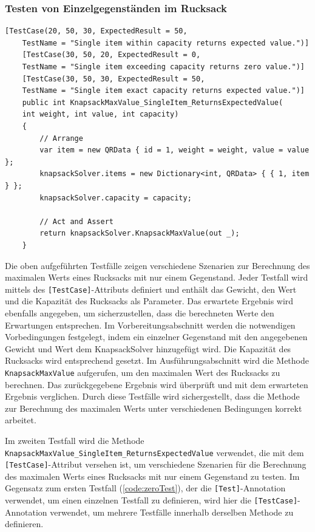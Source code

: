 \begin{itemize}
\subsubsection{Testen von Einzelgegenständen im Rucksack}

\begin{lstlisting}[style=csharp, caption={Testfall: einzelne Gegenstände}, label={code:einzelTest}]
    [TestCase(20, 50, 30, ExpectedResult = 50,
    TestName = "Single item within capacity returns expected value.")]
    [TestCase(30, 50, 20, ExpectedResult = 0,
    TestName = "Single item exceeding capacity returns zero value.")]
    [TestCase(30, 50, 30, ExpectedResult = 50,
    TestName = "Single item exact capacity returns expected value.")]
    public int KnapsackMaxValue_SingleItem_ReturnsExpectedValue(
    int weight, int value, int capacity)
    {
        // Arrange
        var item = new QRData { id = 1, weight = weight, value = value };
        knapsackSolver.items = new Dictionary<int, QRData> { { 1, item } };
        knapsackSolver.capacity = capacity;

        // Act and Assert
        return knapsackSolver.KnapsackMaxValue(out _);
    }
\end{lstlisting}

Die oben aufgeführten Testfälle zeigen verschiedene Szenarien zur Berechnung des maximalen Werts eines Rucksacks mit nur einem Gegenstand. Jeder Testfall wird mittels des \texttt{[TestCase]}-Attributs definiert und enthält das Gewicht, den Wert und die Kapazität des Rucksacks als Parameter. Das erwartete Ergebnis wird ebenfalls angegeben, um sicherzustellen, dass die berechneten Werte den Erwartungen entsprechen. Im Vorbereitungsabschnitt werden die notwendigen Vorbedingungen festgelegt, indem ein einzelner Gegenstand mit den angegebenen Gewicht und Wert dem KnapsackSolver hinzugefügt wird. Die Kapazität des Rucksacks wird entsprechend gesetzt. Im Ausführungsabschnitt wird die Methode \texttt{KnapsackMaxValue} aufgerufen, um den maximalen Wert des Rucksacks zu berechnen. Das zurückgegebene Ergebnis wird überprüft und mit dem erwarteten Ergebnis verglichen. Durch diese Testfälle wird sichergestellt, dass die Methode zur Berechnung des maximalen Werts unter verschiedenen Bedingungen korrekt arbeitet.

Im zweiten Testfall wird die Methode \texttt{KnapsackMaxValue\_SingleItem\_ReturnsExpectedValue} verwendet, die mit dem \texttt{[TestCase]}-Attribut versehen ist, um verschiedene Szenarien für die Berechnung des maximalen Werts eines Rucksacks mit nur einem Gegenstand zu testen. Im Gegensatz zum ersten Testfall (\ref{code:zeroTest}), der die \texttt{[Test]}-Annotation verwendet, um einen einzelnen Testfall zu definieren, wird hier die \texttt{[TestCase]}-Annotation verwendet, um mehrere Testfälle innerhalb derselben Methode zu definieren.


\end{itemize}
